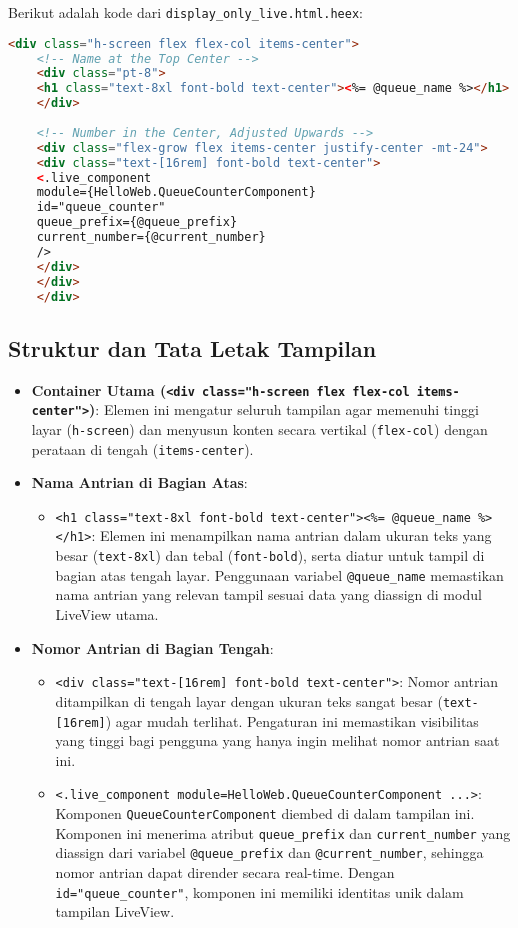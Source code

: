 Berikut adalah kode dari \texttt{display\_only\_live.html.heex}:

\begin{lstlisting}[language=HTML]
	<div class="h-screen flex flex-col items-center">
	<!-- Name at the Top Center -->
	<div class="pt-8">
	<h1 class="text-8xl font-bold text-center"><%= @queue_name %></h1>
	</div>
	
	<!-- Number in the Center, Adjusted Upwards -->
	<div class="flex-grow flex items-center justify-center -mt-24">
	<div class="text-[16rem] font-bold text-center">
	<.live_component
	module={HelloWeb.QueueCounterComponent}
	id="queue_counter"
	queue_prefix={@queue_prefix}
	current_number={@current_number}
	/>
	</div>
	</div>
	</div>
\end{lstlisting}

\subsection{Struktur dan Tata Letak Tampilan}

\begin{itemize}
	\item \textbf{Container Utama (\texttt{<div class="h-screen flex flex-col items-center">})}: Elemen ini mengatur seluruh tampilan agar memenuhi tinggi layar (\texttt{h-screen}) dan menyusun konten secara vertikal (\texttt{flex-col}) dengan perataan di tengah (\texttt{items-center}).
	
	\item \textbf{Nama Antrian di Bagian Atas}: 
	\begin{itemize}
		\item \texttt{<h1 class="text-8xl font-bold text-center"><\%= @queue\_name \%></h1>}: Elemen ini menampilkan nama antrian dalam ukuran teks yang besar (\texttt{text-8xl}) dan tebal (\texttt{font-bold}), serta diatur untuk tampil di bagian atas tengah layar. Penggunaan variabel \texttt{@queue\_name} memastikan nama antrian yang relevan tampil sesuai data yang diassign di modul LiveView utama.
	\end{itemize}
	
	\item \textbf{Nomor Antrian di Bagian Tengah}: 
	\begin{itemize}
		\item \texttt{<div class="text-[16rem] font-bold text-center">}: Nomor antrian ditampilkan di tengah layar dengan ukuran teks sangat besar (\texttt{text-[16rem]}) agar mudah terlihat. Pengaturan ini memastikan visibilitas yang tinggi bagi pengguna yang hanya ingin melihat nomor antrian saat ini.
		\item \texttt{<.live\_component module={HelloWeb.QueueCounterComponent} ...>}: Komponen \texttt{QueueCounterComponent} diembed di dalam tampilan ini. Komponen ini menerima atribut \texttt{queue\_prefix} dan \texttt{current\_number} yang diassign dari variabel \texttt{@queue\_prefix} dan \texttt{@current\_number}, sehingga nomor antrian dapat dirender secara real-time. Dengan \texttt{id="queue\_counter"}, komponen ini memiliki identitas unik dalam tampilan LiveView.
	\end{itemize}
\end{itemize}

